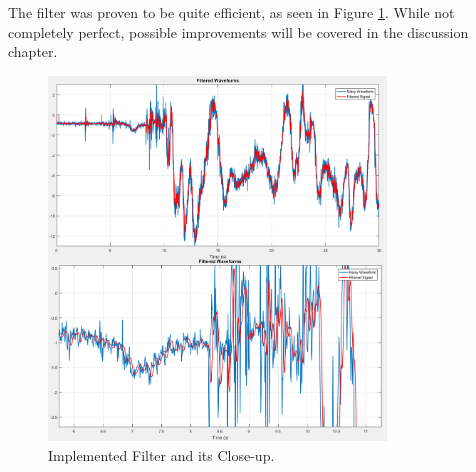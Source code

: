 

The filter was proven to be quite efficient, as seen in Figure \ref{accelFilter}. While not completely perfect, possible improvements will be covered in the discussion chapter.

\begin{figure}[H]
  \centering
    \includegraphics[width=0.8\textwidth]{images/accelFilter.png}
	\caption{Implemented Filter and its Close-up.}
	\label{accelFilter}
\end{figure}